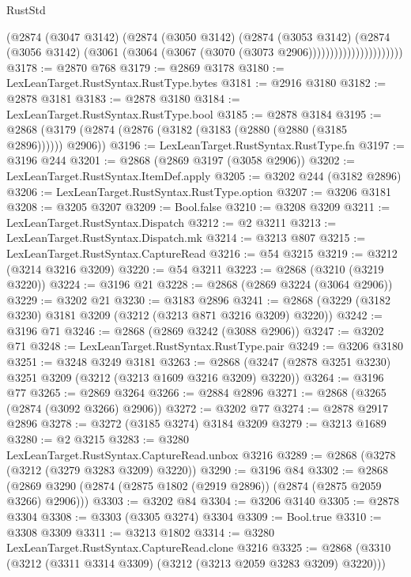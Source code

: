 \begin{lexlean}{RustStd}
\begin{coremodule}
{\begin{coremodule}
{{{{{{{{{{{{{{{{{{{{{{{{{{{{{{{{{{{{{{{{{{{{{{{{{{{{{{{{{{{{{{{{{{{{{{{{{{{{{{{{{{{{{                              (@2874
                                (@3047 @3142)
                                (@2874
                                  (@3050 @3142)
                                  (@2874
                                    (@3053 @3142)
                                    (@2874
                                      (@3056 @3142)
                                      (@3061 (@3064 (@3067 (@3070 (@3073 @2906))))))))))))))))))))))
@3178 := @2870 @768
@3179 := @2869 @3178
@3180 := LexLeanTarget.RustSyntax.RustType.bytes
@3181 := @2916 @3180
@3182 := @2878 @3181
@3183 := @2878 @3180
@3184 := LexLeanTarget.RustSyntax.RustType.bool
@3185 := @2878 @3184
@3195 := @2868 (@3179 (@2874 (@2876 (@3182 (@3183 (@2880 (@2880 (@3185 @2896)))))) @2906))
@3196 := LexLeanTarget.RustSyntax.RustType.fn
@3197 := @3196 @244
@3201 := @2868 (@2869 @3197 (@3058 @2906))
@3202 := LexLeanTarget.RustSyntax.ItemDef.apply
@3205 := @3202 @244 (@3182 @2896)
@3206 := LexLeanTarget.RustSyntax.RustType.option
@3207 := @3206 @3181
@3208 := @3205 @3207
@3209 := Bool.false
@3210 := @3208 @3209
@3211 := LexLeanTarget.RustSyntax.Dispatch
@3212 := @2 @3211
@3213 := LexLeanTarget.RustSyntax.Dispatch.mk
@3214 := @3213 @807
@3215 := LexLeanTarget.RustSyntax.CaptureRead
@3216 := @54 @3215
@3219 := @3212 (@3214 @3216 @3209)
@3220 := @54 @3211
@3223 := @2868 (@3210 (@3219 @3220))
@3224 := @3196 @21
@3228 := @2868 (@2869 @3224 (@3064 @2906))
@3229 := @3202 @21
@3230 := @3183 @2896
@3241 := @2868 (@3229 (@3182 @3230) @3181 @3209 (@3212 (@3213 @871 @3216 @3209) @3220))
@3242 := @3196 @71
@3246 := @2868 (@2869 @3242 (@3088 @2906))
@3247 := @3202 @71
@3248 := LexLeanTarget.RustSyntax.RustType.pair
@3249 := @3206 @3180
@3251 := @3248 @3249 @3181
@3263 := @2868 (@3247 (@2878 @3251 @3230) @3251 @3209 (@3212 (@3213 @1609 @3216 @3209) @3220))
@3264 := @3196 @77
@3265 := @2869 @3264
@3266 := @2884 @2896
@3271 := @2868 (@3265 (@2874 (@3092 @3266) @2906))
@3272 := @3202 @77
@3274 := @2878 @2917 @2896
@3278 := @3272 (@3185 @3274) @3184 @3209
@3279 := @3213 @1689
@3280 := @2 @3215
@3283 := @3280 LexLeanTarget.RustSyntax.CaptureRead.unbox @3216
@3289 := @2868 (@3278 (@3212 (@3279 @3283 @3209) @3220))
@3290 := @3196 @84
@3302 := @2868 (@2869 @3290 (@2874 (@2875 @1802 (@2919 @2896)) (@2874 (@2875 @2059 @3266) @2906)))
@3303 := @3202 @84
@3304 := @3206 @3140
@3305 := @2878 @3304
@3308 := @3303 (@3305 @3274) @3304
@3309 := Bool.true
@3310 := @3308 @3309
@3311 := @3213 @1802
@3314 := @3280 LexLeanTarget.RustSyntax.CaptureRead.clone @3216
@3325 := @2868 (@3310 (@3212 (@3311 @3314 @3309) (@3212 (@3213 @2059 @3283 @3209) @3220)))
}}}}}}}}}}}}}}}}}}}}}}}}}}}}}}}}}}}}}}}}}}}}}}}}}}}}}}}}}}}}}}}}}}}}}}}}}}}}}}}}}}}}}
\end{coremodule}}
\end{coremodule}
\end{lexlean}
